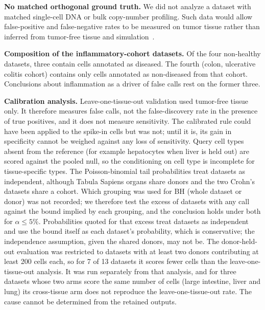 \documentclass[11pt,letterpaper]{article}
\begin{document}
\textbf{No matched orthogonal ground truth.} We did not analyze a dataset with matched single-cell DNA or bulk copy-number profiling. Such data would allow false-positive and false-negative rates to be measured on tumor tissue rather than inferred from tumor-free tissue and simulation~\cite{schmid2025,song2025}.

\textbf{Composition of the inflammatory-cohort datasets.} Of the four non-healthy datasets, three contain cells annotated as diseased. The fourth (colon, ulcerative colitis cohort) contains only cells annotated as non-diseased from that cohort. Conclusions about inflammation as a driver of false calls rest on the former three.

\textbf{Calibration analysis.} Leave-one-tissue-out validation used tumor-free tissue only. It therefore measures false calls, not the false-discovery rate in the presence of true positives, and it does not measure sensitivity. The calibrated rule could have been applied to the spike-in cells but was not; until it is, its gain in specificity cannot be weighed against any loss of sensitivity. Query cell types absent from the reference (for example hepatocytes when liver is held out) are scored against the pooled null, so the conditioning on cell type is incomplete for tissue-specific types. The Poisson-binomial tail probabilities treat datasets as independent, although Tabula Sapiens organs share donors and the two Crohn's datasets share a cohort. Which grouping was used for BH (whole dataset or donor) was not recorded; we therefore test the excess of datasets with any call against the bound implied by each grouping, and the conclusion holds under both for $\alpha \le 5\%$. Probabilities quoted for that excess treat datasets as independent and use the bound itself as each dataset's probability, which is conservative; the independence assumption, given the shared donors, may not be. The donor-held-out evaluation was restricted to datasets with at least two donors contributing at least 200 cells each, so for 7 of 13 datasets it scores fewer cells than the leave-one-tissue-out analysis. It was run separately from that analysis, and for three datasets whose two arms score the same number of cells (large intestine, liver and lung) its cross-tissue arm does not reproduce the leave-one-tissue-out rate. The cause cannot be determined from the retained outputs.
\end{document}
